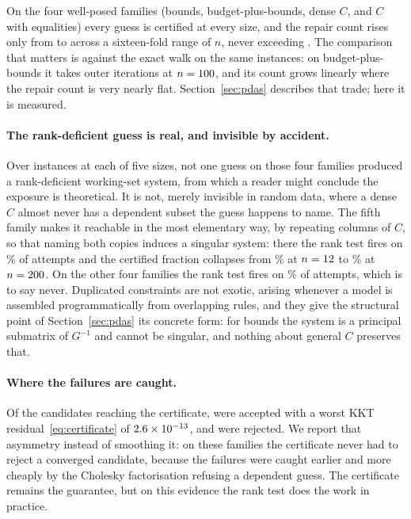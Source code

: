 On the four well-posed families (bounds, budget-plus-bounds, dense $C$, and $C$
with equalities) every guess is certified at every size, and the repair
count rises only from \qpPdasRepairsLo{} to \qpPdasRepairsHi{} across a
sixteen-fold range of $n$, never exceeding \qpPdasRepairsMax{}. The comparison
that matters is against the exact walk on the same instances: on
budget-plus-bounds it takes \qpPdasBudgetOuter{} outer iterations at
$n = 100{}$, and its count grows linearly where the repair count is very
nearly flat. Section~\ref{sec:pdas} describes that trade; here it is measured.

\paragraph{The rank-deficient guess is real, and invisible by accident.} Over
\qpPdasInstances{} instances at each of five sizes, not one guess on those four
families produced a rank-deficient working-set system, from which a reader might
conclude the exposure is theoretical. It is not, merely invisible in random data,
where a dense $C$ almost never has a dependent subset the guess happens to name.
The fifth family makes it reachable in the most elementary way, by repeating
columns of $C$, so that naming both copies induces a singular system: there the
rank test fires on \qpPdasSingularDup\% of attempts and the certified fraction
collapses from \qpPdasCertSmall\% at $n = 12{}$ to \qpPdasCertBig\% at
$n = 200{}$. On the other four families the rank test fires on
\qpPdasSingularBox\% of attempts, which is to say never. Duplicated
constraints are not exotic, arising whenever a model is assembled programmatically
from overlapping rules, and they give the structural point of
Section~\ref{sec:pdas} its concrete form: for bounds the system is a principal
submatrix of $G^{-1}$ and cannot be singular, and nothing about general $C$
preserves that.

\paragraph{Where the failures are caught.} Of the candidates reaching the
certificate, \qpPdasAccepted{} were accepted with a worst KKT
residual~\eqref{eq:certificate} of $2.6\times 10^{-13}$, and \qpPdasRejected{}
were rejected. We report that asymmetry instead of smoothing it: on these
families the certificate never had to reject a converged candidate, because the
failures were caught earlier and more cheaply by the Cholesky factorisation
refusing a dependent guess. The certificate remains the guarantee, but on this
evidence the rank test does the work in practice.

